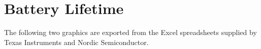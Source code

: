 \section{Battery Lifetime} %
\label{sec:battery_life_appendix}

The following two graphics are exported from the Excel spreadsheets supplied by Texas Instruments and Nordic Semiconductor.

